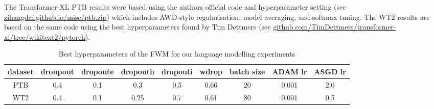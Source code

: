 \documentclass{article} \usepackage{iclr2021_conference,times}
\begin{document}
The Transformer-XL PTB results were based using the authors official code and hyperparameter setting (see \href{http://zihangdai.github.io/misc/ptb.zip}{zihangdai.github.io/misc/ptb.zip}) which includes AWD-style regularisation, model averaging, and softmax tuning. The WT2 results are based on the same code using the best hyperparameters found by Tim Dettmers (see \href{https://github.com/TimDettmers/transformer-xl/tree/wikitext2/pytorch}{github.com/TimDettmers/transformer-xl/tree/wikitext2/pytorch}). 
\begin{table}[h]
\caption{Best hyperparameters of the FWM for our language modelling experiments}
  \centering
  \setlength{\tabcolsep}{0.15cm}
  \begin{tabular}{ccccccccc}
    \toprule
    dataset & droupout & dropoute & dropouth & dropouti & wdrop & batch size & ADAM lr & ASGD lr \\
    \midrule
    PTB & 0.4 & 0.1 & 0.3 & 0.5 & 0.66 & 20 & 0.001 & 2.0 \\
    WT2 & 0.4 & 0.1 & 0.25 & 0.7 & 0.61 & 80 & 0.001 & 0.5 \\
    \bottomrule
  \end{tabular}
  \label{appendix:tbl:lmparams}
\end{table}
\end{document}
